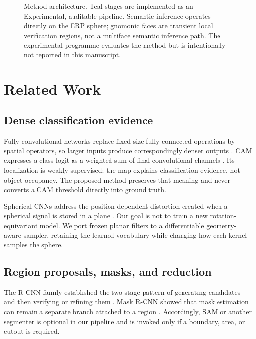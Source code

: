 \documentclass[a4paper,9pt]{extarticle}
\begin{document}
\begin{figure}[t]
\caption{Method architecture. Teal stages are implemented as an Experimental, auditable pipeline. Semantic inference operates directly on the ERP sphere; gnomonic faces are transient local verification regions, not a multiface semantic inference path. The experimental programme evaluates the method but is intentionally not reported in this manuscript.}
\label{fig:pipeline}
\end{figure}

\section{Related Work}

\subsection{Dense classification evidence}

Fully convolutional networks replace fixed-size fully connected operations by spatial operators, so larger inputs produce correspondingly denser outputs \citep{long2015fcn}. CAM expresses a class logit as a weighted sum of final convolutional channels \citep{zhou2016cam}. Its localization is weakly supervised: the map explains classification evidence, not object occupancy. The proposed method preserves that meaning and never converts a CAM threshold directly into ground truth.

Spherical CNNs address the position-dependent distortion created when a spherical signal is stored in a plane \citep{cohen2018spherical}. Our goal is not to train a new rotation-equivariant model. We port frozen planar filters to a differentiable geometry-aware sampler, retaining the learned vocabulary while changing how each kernel samples the sphere.

\subsection{Region proposals, masks, and reduction}

The R-CNN family established the two-stage pattern of generating candidates and then verifying or refining them \citep{girshick2014rcnn,girshick2015fast,ren2015faster}. Mask R-CNN showed that mask estimation can remain a separate branch attached to a region \citep{he2017mask}. Accordingly, SAM or another segmenter is optional in our pipeline and is invoked only if a boundary, area, or cutout is required.
\end{document}
